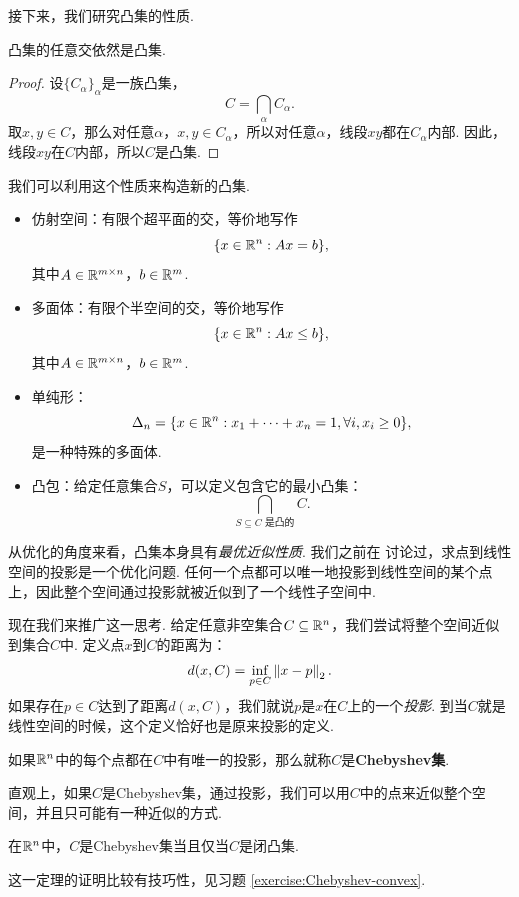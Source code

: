 接下来，我们研究凸集的性质.

\begin{proposition}\label{prop:convex-set-intersect}
    凸集的任意交依然是凸集.
\end{proposition}
\begin{proof}
    设$\{C_\alpha\}_\alpha$是一族凸集，
    \[C=\bigcap_\alpha C_\alpha.\]
    取$x,y\in C$，那么对任意$\alpha$，$x,y\in C_\alpha$，所以对任意$\alpha$，线段$xy$都在$C_\alpha$内部. 因此，线段$xy$在$C$内部，所以$C$是凸集.
\end{proof}

我们可以利用这个性质来构造新的凸集.
\begin{example}
\begin{itemize}
    \item 仿射空间：有限个超平面的交，等价地写作
    \[\{x\in\mathbb{R}^n:Ax=b\},\]
    其中$A\in\mathbb{R}^{m\times n}$，$b\in\mathbb{R}^m$.
    \item 多面体：有限个半空间的交，等价地写作
    \[\{x\in\mathbb{R}^n:Ax\leq b\},\]
    其中$A\in\mathbb{R}^{m\times n}$，$b\in\mathbb{R}^m$.
    \item 单纯形：
    \[\Delta_n=\{x\in\mathbb{R}^n:x_1+\dots+x_n=1,\forall i,x_i\geq 0\},\]
    是一种特殊的多面体.
    \item 凸包：给定任意集合$S$，可以定义包含它的最小凸集：
    \[\bigcap_{S\subseteq C\text{ 是凸的}} C.\]
\end{itemize}
\end{example}

从优化的角度来看，凸集本身具有\textit{最优近似性质}. 我们之前在 讨论过，求点到线性空间的投影是一个优化问题. 任何一个点都可以唯一地投影到线性空间的某个点上，因此整个空间通过投影就被近似到了一个线性子空间中. 

现在我们来推广这一思考. 给定任意非空集合$C\subseteq\mathbb{R}^n$，我们尝试将整个空间近似到集合$C$中. 定义点$x$到$C$的距离为：
\[d(x,C)=\inf_{p\in C}\left\|x-p\right\|_2.\]
如果存在$p\in C$达到了距离$d(x,C)$，我们就说$p$是$x$在$C$上的一个\textit{投影}. 到当$C$就是线性空间的时候，这个定义恰好也是原来投影的定义.

如果$\mathbb{R}^n$中的每个点都在$C$中有唯一的投影，那么就称$C$是\textbf{Chebyshev集}. 

直观上，如果$C$是Chebyshev集，通过投影，我们可以用$C$中的点来近似整个空间，并且只可能有一种近似的方式. 

\begin{theorem}\label{thm:Chebyshev-convex}
    在$\mathbb{R}^n$中，$C$是Chebyshev集当且仅当$C$是闭凸集.
\end{theorem}
这一定理的证明比较有技巧性，见习题 \ref{exercise:Chebyshev-convex}.

